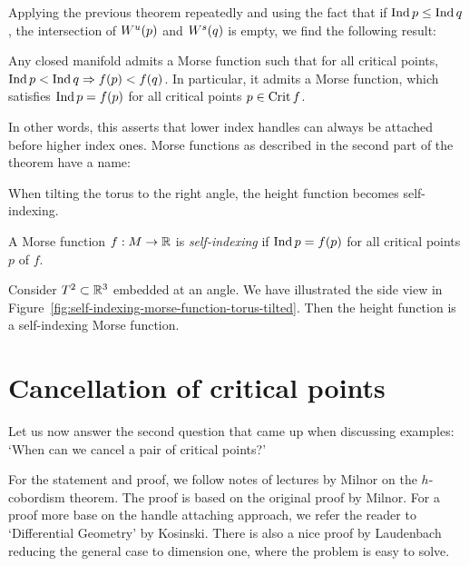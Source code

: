 Applying the previous theorem repeatedly and using the fact that if $\operatorname{Ind} p \le  \operatorname{Ind} q$, the intersection of $W^u(p)$ and  $W^s(q)$ is empty, we find the following result:

\begin{theorem}
    Any closed manifold admits a Morse function such that for all critical points, $\operatorname{Ind} p < \operatorname{Ind} q \Rightarrow f(p) < f(q)$.
    In particular, it admits a Morse function, which satisfies $ \operatorname{Ind} p  = f(p) $ for all critical points $p \in \operatorname{Crit} f$.
\end{theorem}
In other words, this asserts that lower index handles can always be attached before higher index ones.
Morse functions as described in the second part of the theorem have a name:
\begin{marginfigure}
    \centering
    \caption{When tilting the torus to the right angle, the height function becomes self-indexing.}
    \label{fig:self-indexing-morse-function-torus-tilted}
\end{marginfigure}
\begin{definition}
    A Morse function $f: M \to  \mathbb{R}$ is \emph{self-indexing} if $\operatorname{Ind} p = f(p)$ for all critical points  $p$ of  $f$.
\end{definition}
\begin{eg}
    Consider $T^2 \subset \mathbb{R}^3$ embedded at an angle. We have illustrated the side view in Figure~\ref{fig:self-indexing-morse-function-torus-tilted}.
    Then the height function is a self-indexing Morse function.
\end{eg}


\section{Cancellation of critical points}

Let us now answer the second question that came up when discussing examples: `When can we cancel a pair of critical points?'

For the statement and proof, we follow notes of lectures by Milnor on the $h$-cobordism theorem.
The proof is based on the original proof by Milnor.
For a proof more base on the handle attaching approach, we refer the reader to `Differential Geometry' by Kosinski.
There is also a nice proof by Laudenbach reducing the general case to dimension one, where the problem is easy to solve.


